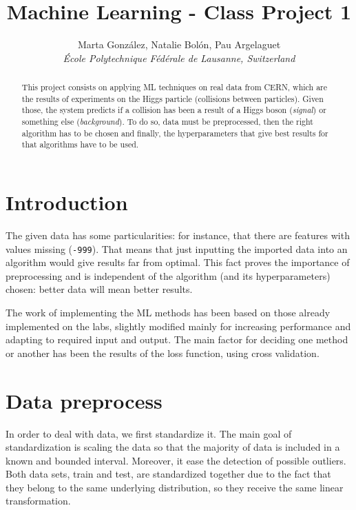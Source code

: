 \documentclass[10pt,conference]{IEEEtran}
\begin{document}
\title{\huge Machine Learning - Class Project 1}

\author{
  Marta González, Natalie Bolón, Pau Argelaguet\\
  \small \textit{École Polytechnique Fédérale de Lausanne, Switzerland}
}

\maketitle

\begin{abstract}
This project consists on applying ML techniques on real data from CERN, which are the results of experiments on the Higgs particle (collisions between particles). Given those, the system predicts if a collision has been a result of a Higgs boson (\textit{signal}) or something else (\textit{background}). To do so, data must be preprocessed, then the right algorithm has to be chosen and finally, the hyperparameters that give best results for that algorithms have to be used.
\end{abstract}

\section{Introduction}

The given data has some particularities: for instance, that there are features with values missing (\verb|-999|). That means that just inputting the imported data into an algorithm would give results far from optimal. This fact proves the importance of preprocessing and is independent of the algorithm (and its hyperparameters) chosen: better data will mean better results.

The work of implementing the ML methods has been based on those already implemented on the labs, slightly modified mainly for increasing performance and adapting to required input and output. The main factor for deciding one method or another has been the results of the loss function, using cross validation.

\section{Data preprocess}
In order to deal with data, we first standardize it. The main goal of standardization is scaling the data so that the majority of data is included in a known and bounded interval. Moreover, it ease the detection of possible outliers. Both data sets, train and test, are standardized together due to the fact that they belong to the same underlying distribution, so they receive the same linear transformation. 
\end{document}
